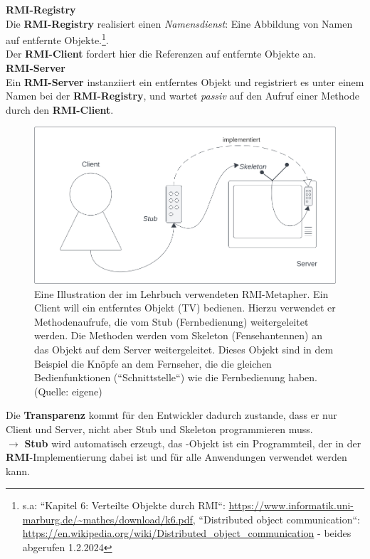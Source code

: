 \begin{tcolorbox}[enlarge top by=0.5cm,enlarge bottom by=0.5cm]
    \noindent
    \textbf{RMI-Registry}\\
    Die \textbf{RMI-Registry} realisiert einen \textit{Namensdienst}: Eine Abbildung von Namen auf entfernte Objekte.\footnote{
        s.a: ``Kapitel 6: Verteilte Objekte durch RMI``: \url{https://www.informatik.uni-marburg.de/~mathes/download/k6.pdf}, ``Distributed object communication``: \url{https://en.wikipedia.org/wiki/Distributed_object_communication} - beides abgerufen 1.2.2024
    }. \\
    Der \textbf{RMI-Client} fordert hier die Referenzen auf entfernte Objekte an.\\

    \noindent
    \textbf{RMI-Server}\\
    Ein \textbf{RMI-Server} instanziiert ein entferntes Objekt und registriert es unter einem Namen bei der \textbf{RMI-Registry}, und wartet \textit{passiv} auf den Aufruf einer Methode durch den \textbf{RMI-Client}.

\end{tcolorbox}

\begin{figure}
    \centering
    \includegraphics[scale=0.35]{chapters/fopt5/img/rmi/tv}
    \caption{Eine Illustration der im Lehrbuch verwendeten RMI-Metapher. Ein Client will ein entferntes Objekt (TV) bedienen. Hierzu verwendet er Methodenaufrufe, die vom Stub (Fernbedienung) weitergeleitet werden. Die Methoden werden vom Skeleton (Fensehantennen) an das Objekt auf dem Server weitergeleitet. Dieses Objekt sind in dem Beispiel die Knöpfe an dem Fernseher, die die gleichen Bedienfunktionen (``Schnittstelle``) wie die Fernbedienung haben. (Quelle: eigene)}
    \label{fig:tv}
\end{figure}

\noindent
Die \textbf{Transparenz} kommt für den Entwickler dadurch zustande, dass er nur Client und Server, nicht aber Stub und Skeleton programmieren muss.\\
$\rightarrow$ \textbf{Stub} wird automatisch erzeugt, das -Objekt ist ein Programmteil, der in der \textbf{RMI}-Implementierung dabei ist und für alle Anwendungen verwendet werden kann.\\

